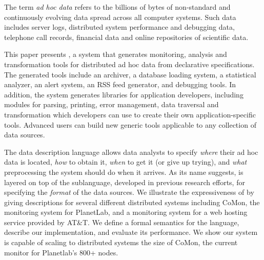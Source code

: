 The term {\em ad hoc data} refers to the billions of bytes of
non-standard and continuously evolving data spread across all computer
systems.  Such data includes server logs, distributed system
performance and debugging data, telephone call records, financial data
and online repositories of scientific data.

This paper presents \padsd{}, a system that generates monitoring,
analysis and transformation tools for distributed ad hoc data from
declarative specifications.  The generated tools include an archiver,
a database loading system, a statistical analyzer, an alert system, 
an RSS feed generator, and
debugging tools.  In addition, the system generates libraries for
application developers, including modules for parsing, printing, error
management, data traversal and transformation which developers can use
to create their own application-specific tools.  Advanced users can
build new generic tools applicable to any collection of data sources.

The \padsd{} data description language allows data analysts to specify
{\em where} their ad hoc data is located, {\em how} to obtain it, {\em
when} to get it (or give up trying), and {\em what}
preprocessing the system should do when it arrives.  As its name
suggests, \padsd{} is layered on top of the \pads{} sublanguage,
developed in previous research efforts, for specifying the {\em
format} of the data sources.  We illustrate the expressiveness of
\padsd{} by giving descriptions for several different distributed
systems including CoMon, the monitoring system for PlanetLab, and a
monitoring system for a web hosting service provided by AT\&T.  We
define a formal semantics for the language, describe our
implementation, and evaluate its performance.  We show our system is
capable of scaling to distributed systems the size of CoMon,
the current monitor for Planetlab's 800+ nodes.



